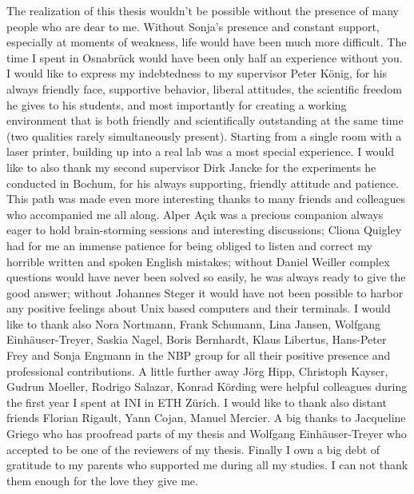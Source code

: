 The realization of this thesis wouldn't be possible without the presence of
many people who are dear to me. Without Sonja's presence and
constant support, especially at moments of weakness, life would have been
much more difficult. The time I spent in Osnabr\"uck would have
been only half an experience without you. I would like to express my indebtedness to my
supervisor Peter K\"onig, for his always friendly face, supportive
behavior, liberal attitudes, the scientific freedom he gives to his
students, and most importantly for creating a working environment that is
both friendly and scientifically outstanding at the same time (two
qualities rarely simultaneously present). Starting from a single room with
a laser printer, building up into a real lab was a most special experience.
I would like to also thank my second supervisor Dirk Jancke for the
experiments he conducted in Bochum, for his always supporting, friendly
attitude and patience. This path was made even more interesting thanks to
many friends and colleagues who accompanied me all along. Alper
A\c{c}{\i}k was a precious companion always eager to hold brain-storming
sessions and interesting discussions; Cliona Quigley had for me an immense
patience for being obliged to listen and correct my horrible written and
spoken English mistakes; without Daniel Weiller complex questions would
have never been solved so easily, he was always ready to give the good
answer; without Johannes Steger it would have not been possible to harbor
any positive feelings about Unix based computers and their terminals. I
would like to thank also Nora Nortmann, Frank Schumann, Lina Jansen,
Wolfgang Einh\"auser-Treyer, Saskia Nagel, Boris Bernhardt, Klaus Libertus,
Hans-Peter Frey and Sonja Engmann in the NBP group for all their positive
presence and professional contributions. A little further away J\"org Hipp,
Christoph Kayser, Gudrun Moeller, Rodrigo Salazar, Konrad K\"ording were
helpful colleagues during the first year I spent at INI in ETH Z\"urich. I
would like to thank also distant friends Florian Rigault, Yann Cojan,
Manuel Mercier. A big thanks to Jacqueline Griego who has proofread parts
of my thesis and Wolfgang Einh\"auser-Treyer who accepted to be one of the
reviewers of my thesis. Finally I own a big debt of gratitude to my parents who
supported me during all my studies. I can not thank them enough for the
love they give me.\\ \\ \\ 

